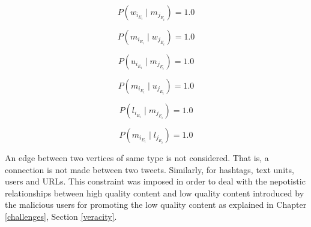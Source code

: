 \begin{equation}
P(w_{i_{E_{i}}} \mid m_{j_{E_{i}}}) = 1.0
\end{equation}

\begin{equation}
P(m_{i_{E_{i}}} \mid w_{j_{E_{i}}}) = 1.0
\end{equation}

\begin{equation}
P(u_{i_{E_{i}}} \mid m_{j_{E_{i}}}) = 1.0
\end{equation}

\begin{equation}
P(m_{i_{E_{i}}} \mid u_{j_{E_{i}}}) = 1.0
\end{equation}

\begin{equation}
P(l_{i_{E_{i}}} \mid m_{j_{E_{i}}}) = 1.0
\end{equation}

\begin{equation}
P(m_{i_{E_{i}}} \mid l_{j_{E_{i}}}) = 1.0
\end{equation}


An edge between two vertices of same type is not considered. That is, a connection is not made between two tweets. Similarly, for hashtags, text units, users and URLs. This constraint was imposed in order to deal with the nepotistic relationships between high quality content and low quality content introduced by the malicious users for promoting the low quality content as explained in Chapter \ref{challenges}, Section \ref{veracity}.  



